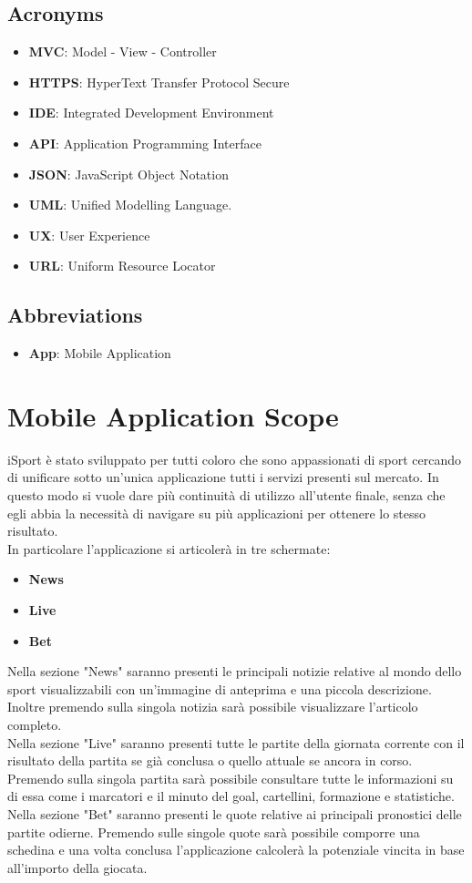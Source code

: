 \documentclass[numbers=noenddot, 12pt, a4paper, oneside]{scrbook}
\begin{document}
\subsection*{Acronyms}
\begin{itemize}
	\item \textbf{MVC}: Model - View - Controller
	\item \textbf{HTTPS}: HyperText Transfer Protocol Secure
	\item \textbf{IDE}: Integrated Development Environment
	\item \textbf{API}: Application Programming Interface
	\item \textbf{JSON}: JavaScript Object Notation
	\item \textbf{UML}: Unified Modelling Language.
	\item \textbf{UX}: User Experience
	\item \textbf{URL}: Uniform Resource Locator
\end{itemize}
\subsection*{Abbreviations}
\begin{itemize}
	\item \textbf{App}: Mobile Application 
\end{itemize}

\section{Mobile Application Scope}
iSport è stato sviluppato per tutti coloro che sono appassionati di sport cercando di unificare sotto un'unica applicazione tutti i servizi presenti sul mercato. In questo modo si vuole dare più continuità di utilizzo all'utente finale, senza che egli abbia la necessità di navigare su più applicazioni per ottenere lo stesso risultato.\\
In particolare l'applicazione si articolerà in tre schermate:
\begin{itemize}
	\item \textbf{News}
	\item \textbf{Live}
	\item \textbf{Bet}
\end{itemize}
Nella sezione "News" saranno presenti le principali notizie relative al mondo dello sport visualizzabili con un'immagine di anteprima e una piccola descrizione. Inoltre premendo sulla singola notizia sarà possibile visualizzare l'articolo completo.\\
Nella sezione "Live" saranno presenti tutte le partite della giornata corrente con il risultato della partita se già conclusa o quello attuale se ancora in corso. Premendo sulla singola partita sarà possibile consultare tutte le informazioni su di essa come i marcatori e il minuto del goal, cartellini, formazione e statistiche.\\
Nella sezione "Bet" saranno presenti le quote relative ai principali pronostici delle partite odierne. Premendo sulle singole quote sarà possibile comporre una schedina e una volta conclusa l'applicazione calcolerà la potenziale vincita in base all'importo della giocata.
\end{document}
